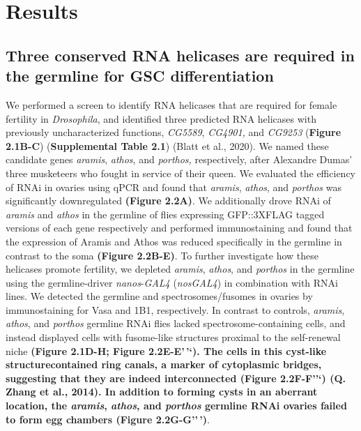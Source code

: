 \documentclass[12pt,oneside]{reedthesis}
\begin{document}
\hypertarget{results}{%
\section{Results}\label{results}}

\hypertarget{three-conserved-rna-helicases-are-required-in-the-germline-for-gsc-differentiation}{%
\subsection{Three conserved RNA helicases are required in the germline for GSC differentiation}\label{three-conserved-rna-helicases-are-required-in-the-germline-for-gsc-differentiation}}

We performed a screen to identify RNA helicases that are required for female fertility in \emph{Drosophila}, and identified three predicted RNA helicases with previously uncharacterized functions, \emph{CG5589}, \emph{CG4901,} and \emph{CG9253} (\textbf{Figure 2.1B-C}) (\textbf{Supplemental Table 2.1}) (Blatt et al., 2020). We named these candidate genes \emph{aramis}, \emph{athos}, and \emph{porthos,} respectively, after Alexandre Dumas' three musketeers who fought in service of their queen. We evaluated the efficiency of RNAi in ovaries using qPCR and found that \emph{aramis}, \emph{athos}, and \emph{porthos} was significantly downregulated \textbf{(Figure 2.2A)}. We additionally drove RNAi of \emph{aramis} and \emph{athos} in the germline of flies expressing GFP::3XFLAG tagged versions of each gene respectively and performed immunostaining and found that the expression of Aramis and Athos was reduced specifically in the germline in contrast to the soma \textbf{(Figure 2.2B-E)}. To further investigate how these helicases promote fertility, we depleted \emph{aramis}, \emph{athos}, and \emph{porthos} in the germline using the germline-driver \emph{nanos}-\emph{GAL4} (\emph{nosGAL4}) in combination with RNAi lines. We detected the germline and spectrosomes/fusomes in ovaries by immunostaining for Vasa and 1B1, respectively. In contrast to controls, \emph{aramis}, \emph{athos}, and \emph{porthos} germline RNAi flies lacked spectrosome-containing cells, and instead displayed cells with fusome-like structures proximal to the self-renewal niche \textbf{(Figure 2.1D-H; Figure 2.2E-E'\,'`\textbf{). The cells in this cyst-like structurecontained ring canals, a marker of cytoplasmic bridges, suggesting that they are indeed interconnected (}Figure 2.2F-F''`\textbf{) (Q. Zhang et al., 2014). In addition to forming cysts in an aberrant location, the \emph{aramis}, \emph{athos}, and \emph{porthos} germline RNAi ovaries failed to form egg chambers }(Figure 2.2G-G''\,')}.
\end{document}
